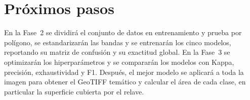 \documentclass{article}
\begin{document}
\section{Próximos pasos}
En la Fase~2 se dividirá el conjunto de datos en entrenamiento y prueba por polígono, se estandarizarán las bandas y se entrenarán los cinco modelos, reportando su matriz de confusión y su exactitud global. En la Fase~3 se optimizarán los hiperparámetros y se compararán los modelos con Kappa, precisión, exhaustividad y F1. Después, el mejor modelo se aplicará a toda la imagen para obtener el GeoTIFF temático y calcular el área de cada clase, en particular la superficie cubierta por el relave.

\printbibliography
\end{document}
